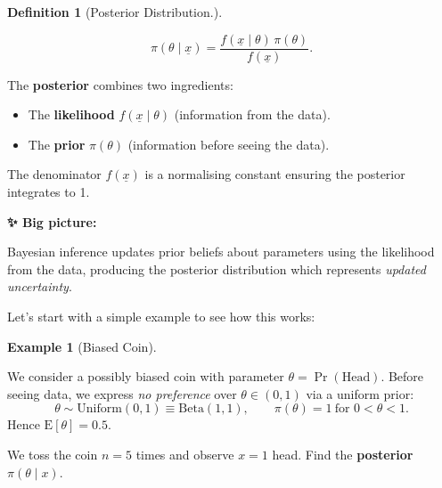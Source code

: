 \documentclass[
  letterpaper,
  DIV=11,
  numbers=noendperiod]{scrreprt}
\providecommand{\tightlist}{%
  \setlength{\itemsep}{0pt}\setlength{\parskip}{0pt}}
\theoremstyle{definition}
\newtheorem{example}{Example}[chapter]
\theoremstyle{plain}
\theoremstyle{definition}
\newtheorem{definition}{Definition}[chapter]
\theoremstyle{remark}
\begin{document}
\begin{definition}[Posterior
Distribution.]\protect\hypertarget{def-posterior}{}\label{def-posterior}

\[
\pi(\theta \mid \underline{x}) 
= \frac{f(\underline{x} \mid \theta)\,\pi(\theta)}{f(\underline{x})}.
\]

The \textbf{posterior} combines two ingredients:

\begin{itemize}
\tightlist
\item
  The \textbf{likelihood} \(f(\underline{x} \mid \theta)\) (information
  from the data).
\item
  The \textbf{prior} \(\pi(\theta)\) (information before seeing the
  data).
\end{itemize}

The denominator \(f(\underline{x})\) is a normalising constant ensuring
the posterior integrates to 1.

\end{definition}

\begin{tcolorbox}[enhanced jigsaw, left=2mm, colframe=quarto-callout-important-color-frame, toprule=.15mm, rightrule=.15mm, leftrule=.75mm, breakable, opacityback=0, arc=.35mm, colback=white, bottomrule=.15mm]

\vspace{-3mm}\textbf{✨ Big picture:}\vspace{3mm}

Bayesian inference updates prior beliefs about parameters using the
likelihood from the data, producing the posterior distribution which
represents \emph{updated uncertainty}.

\end{tcolorbox}

Let's start with a simple example to see how this works:

\begin{example}[Biased
Coin]\protect\hypertarget{exm-biased-coin}{}\label{exm-biased-coin}

We consider a possibly biased coin with parameter
\(\theta = \Pr(\text{Head})\). Before seeing data, we express \emph{no
preference} over \(\theta\in(0,1)\) via a uniform prior: \[
\theta \sim \mathrm{Uniform}(0,1) \equiv \mathrm{Beta}(1,1), \qquad \pi(\theta)=1 \ \text{for } 0<\theta<1.
\] Hence \(\mathrm{E}[\theta]=0.5\).

We toss the coin \(n=5\) times and observe \(x=1\) head. Find the
\textbf{posterior} \(\pi(\theta\mid x)\).

\end{example}
\end{document}
